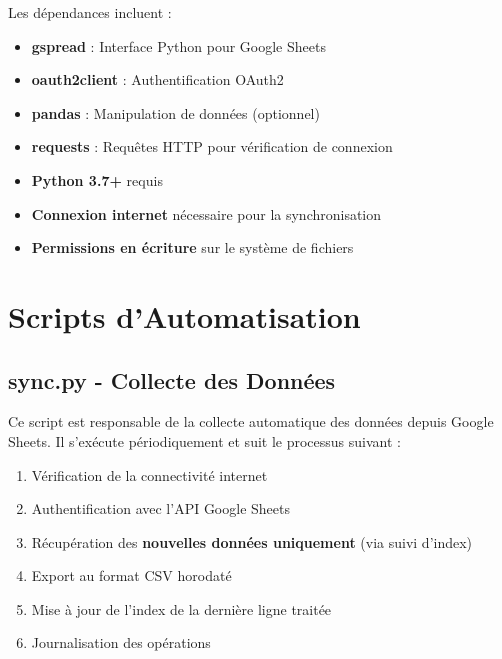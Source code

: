 \documentclass[11pt,a4paper]{article}
\begin{document}
Les dépendances incluent :
\begin{itemize}
    \item \textbf{gspread} : Interface Python pour Google Sheets
    \item \textbf{oauth2client} : Authentification OAuth2
    \item \textbf{pandas} : Manipulation de données (optionnel)
    \item \textbf{requests} : Requêtes HTTP pour vérification de connexion
\end{itemize}

\begin{itemize}
    \item \textbf{Python 3.7+} requis
    \item \textbf{Connexion internet} nécessaire pour la synchronisation
    \item \textbf{Permissions en écriture} sur le système de fichiers
\end{itemize}

\section{Scripts d'Automatisation}
\label{sec:automation-scripts}

\subsection{sync.py - Collecte des Données}
\label{subsec:sync-script}

Ce script est responsable de la collecte automatique des données depuis Google Sheets. Il s'exécute périodiquement et suit le processus suivant :

\begin{enumerate}
    \item Vérification de la connectivité internet
    \item Authentification avec l'API Google Sheets
    \item Récupération des \textbf{nouvelles données uniquement} (via suivi d'index)
    \item Export au format CSV horodaté
    \item Mise à jour de l'index de la dernière ligne traitée
    \item Journalisation des opérations
\end{enumerate}
\end{document}
